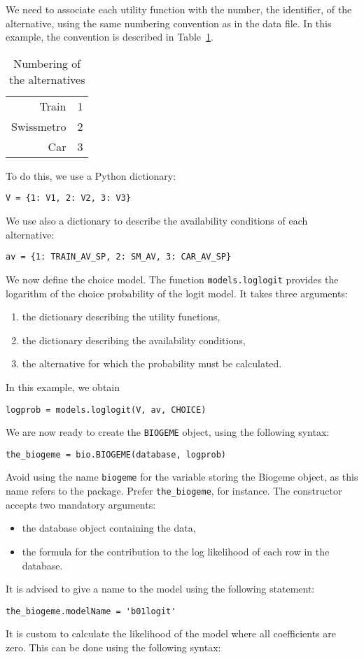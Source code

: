 \documentclass[12pt,a4paper]{article}
\begin{document}
We need to associate each utility function with the number, the identifier, of the
alternative, using the same numbering convention as in the data file. In this
example, the convention is described in Table~\ref{tab:choice}.

\begin{table}[htb]
\begin{center}
\begin{tabular}{rl}
Train & 1 \\
Swissmetro & 2 \\
Car & 3
\end{tabular}
\end{center}
\caption{\label{tab:choice}Numbering of the alternatives}
\end{table}


To do
this, we use a Python dictionary:
\begin{lstlisting}[style=nonumbers]
V = {1: V1, 2: V2, 3: V3}
\end{lstlisting}
We use also a dictionary to describe the availability conditions of
each alternative:
\begin{lstlisting}[style=nonumbers]
av = {1: TRAIN_AV_SP, 2: SM_AV, 3: CAR_AV_SP}
\end{lstlisting}


We now define the choice model. The function \lstinline+models.loglogit+
provides the logarithm of the choice probability of the logit
model. It takes three arguments: 
\begin{enumerate}
\item the dictionary describing the utility functions,
\item the dictionary describing the availability conditions,
\item the alternative for which the probability must be calculated.
\end{enumerate}
In this example, we obtain
\begin{lstlisting}[style=nonumbers]
logprob = models.loglogit(V, av, CHOICE)
\end{lstlisting}

We are now ready to create the \lstinline+BIOGEME+ object, using the
following syntax:
\begin{lstlisting}
the_biogeme = bio.BIOGEME(database, logprob)
\end{lstlisting}
Avoid using the name \lstinline+biogeme+ for the variable storing the Biogeme object, as this name refers to the package. Prefer \lstinline+the_biogeme+, for instance.
The constructor accepts two mandatory arguments:
\begin{itemize}
\item the database object containing the data,
\item the formula for the contribution to the log likelihood of each
  row in the database. 
\end{itemize}
It is advised to give a name to the model using the following
statement:
\begin{lstlisting}
the_biogeme.modelName = 'b01logit'
\end{lstlisting}
It is custom to calculate the likelihood of the model where all coefficients are zero. This can be done using the following syntax:
\end{document}
